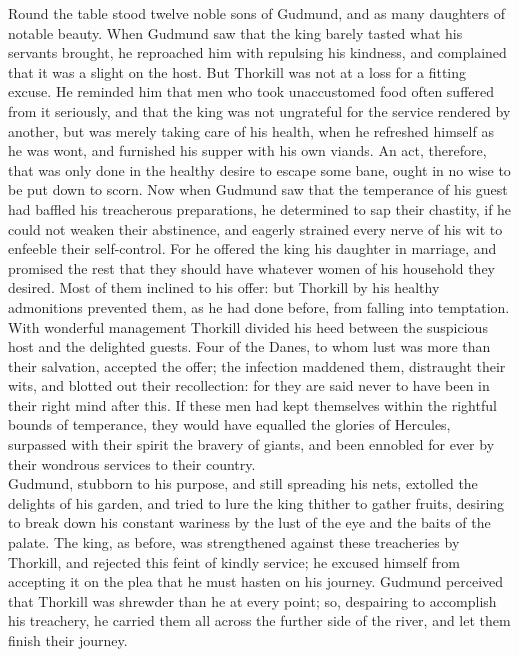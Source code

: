 \documentclass[10pt,a4paper]{report}
\begin{document}
Round the table stood twelve noble sons of Gudmund, and as many daughters of notable beauty. When Gudmund saw that the king barely tasted what his servants brought, he reproached him with repulsing his kindness, and complained that it was a slight on the host. But Thorkill was not at a loss for a fitting excuse. He reminded him that men who took unaccustomed food often suffered from it seriously, and that the king was not ungrateful for the service rendered by another, but was merely taking care of his health, when he refreshed himself as he was wont, and furnished his supper with his own viands. An act, therefore, that was only done in the healthy desire to escape some bane, ought in no wise to be put down to scorn. Now when Gudmund saw that the temperance of his guest had baffled his treacherous preparations, he determined to sap their chastity, if he could not weaken their abstinence, and eagerly strained every nerve of his wit to enfeeble their self-control. For he offered the king his daughter in marriage, and promised the rest that they should have whatever women of his household they desired. Most of them inclined to his offer: but Thorkill by his healthy admonitions prevented them, as he had done before, from falling into temptation.\\

With wonderful management Thorkill divided his heed between the suspicious host and the delighted guests. Four of the Danes, to whom lust was more than their salvation, accepted the offer; the infection maddened them, distraught their wits, and blotted out their recollection: for they are said never to have been in their right mind after this. If these men had kept themselves within the rightful bounds of temperance, they would have equalled the glories of Hercules, surpassed with their spirit the bravery of giants, and been ennobled for ever by their wondrous services to their country.\\

Gudmund, stubborn to his purpose, and still spreading his nets, extolled the delights of his garden, and tried to lure the king thither to gather fruits, desiring to break down his constant wariness by the lust of the eye and the baits of the palate. The king, as before, was strengthened against these treacheries by Thorkill, and rejected this feint of kindly service; he excused himself from accepting it on the plea that he must hasten on his journey. Gudmund perceived that Thorkill was shrewder than he at every point; so, despairing to accomplish his treachery, he carried them all across the further side of the river, and let them finish their journey.\\
\end{document}
